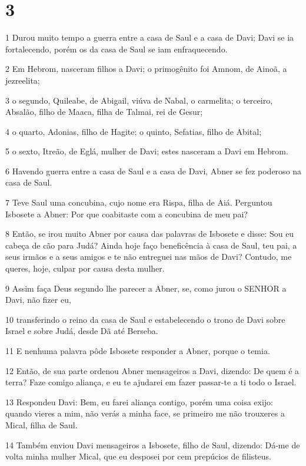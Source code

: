 \chapter{3}

\par 1 Durou muito tempo a guerra entre a casa de Saul e a casa de Davi; Davi se ia fortalecendo, porém os da casa de Saul se iam enfraquecendo.
\par 2 Em Hebrom, nasceram filhos a Davi; o primogênito foi Amnom, de Ainoã, a jezreelita;
\par 3 o segundo, Quileabe, de Abigail, viúva de Nabal, o carmelita; o terceiro, Absalão, filho de Maaca, filha de Talmai, rei de Gesur;
\par 4 o quarto, Adonias, filho de Hagite; o quinto, Sefatias, filho de Abital;
\par 5 o sexto, Itreão, de Eglá, mulher de Davi; estes nasceram a Davi em Hebrom.
\par 6 Havendo guerra entre a casa de Saul e a casa de Davi, Abner se fez poderoso na casa de Saul.
\par 7 Teve Saul uma concubina, cujo nome era Rispa, filha de Aiá. Perguntou Isbosete a Abner: Por que coabitaste com a concubina de meu pai?
\par 8 Então, se irou muito Abner por causa das palavras de Isbosete e disse: Sou eu cabeça de cão para Judá? Ainda hoje faço beneficência à casa de Saul, teu pai, a seus irmãos e a seus amigos e te não entreguei nas mãos de Davi? Contudo, me queres, hoje, culpar por causa desta mulher.
\par 9 Assim faça Deus segundo lhe parecer a Abner, se, como jurou o SENHOR a Davi, não fizer eu,
\par 10 transferindo o reino da casa de Saul e estabelecendo o trono de Davi sobre Israel e sobre Judá, desde Dã até Berseba.
\par 11 E nenhuma palavra pôde Isbosete responder a Abner, porque o temia.
\par 12 Então, de sua parte ordenou Abner mensageiros a Davi, dizendo: De quem é a terra? Faze comigo aliança, e eu te ajudarei em fazer passar-te a ti todo o Israel.
\par 13 Respondeu Davi: Bem, eu farei aliança contigo, porém uma coisa exijo: quando vieres a mim, não verás a minha face, se primeiro me não trouxeres a Mical, filha de Saul.
\par 14 Também enviou Davi mensageiros a Isbosete, filho de Saul, dizendo: Dá-me de volta minha mulher Mical, que eu desposei por cem prepúcios de filisteus.
